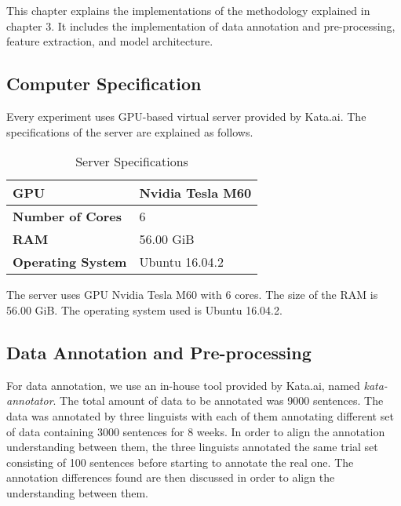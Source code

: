 \chapter{\babEmpat} \label{eksperimen}

This chapter explains the implementations of the methodology explained in chapter 3. It includes the implementation of data annotation and pre-processing, feature extraction, and model architecture.

\section{Computer Specification}
Every experiment uses GPU-based virtual server provided by Kata.ai. The specifications of the server are explained as follows.

\begin{table}
	\centering
	\caption{Server Specifications}
	\begin{tabular}{|l|l|}
		\hline
		\textbf{GPU} & Nvidia Tesla M60 \\ \hline
		\textbf{Number of Cores} & 6 \\ \hline
		\textbf{RAM} & 56.00 GiB \\ \hline
		\textbf{Operating System} & Ubuntu 16.04.2 \\ \hline
	\end{tabular}
	\label{table:spesifikasi hardware}
\end{table}

The server uses GPU Nvidia Tesla M60 with 6 cores. The size of the RAM is 56.00 GiB. The operating system used is Ubuntu 16.04.2.

\section{Data Annotation and Pre-processing}
For data annotation, we use an in-house tool provided by Kata.ai, named \textit{kata-annotator}. The total amount of data to be annotated was 9000 sentences. The data was annotated by three linguists with each of them annotating different set of data containing 3000 sentences for 8 weeks. In order to align the annotation understanding between them, the three linguists annotated the same trial set consisting of 100 sentences before starting to annotate the real one. The annotation differences found are then discussed in order to align the understanding between them.

